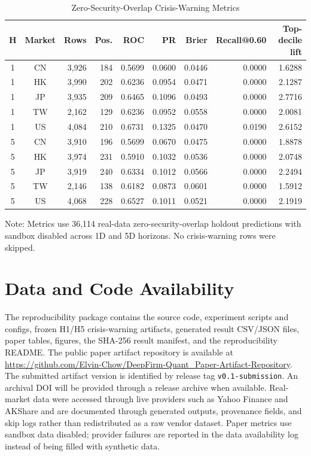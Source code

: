 \documentclass{ieeeaccess}
\newcommand{\tabnote}[1]{\vspace{2pt}\begin{flushleft}\footnotesize Note: #1\end{flushleft}}
\begin{document}
\begin{table}[t]
\caption{Zero-Security-Overlap Crisis-Warning Metrics}
\label{tab:zero-crisis}
\centering
\scriptsize
\begin{tabularx}{\textwidth}{c c r r r r r r r}
\toprule
H & Market & Rows & Pos. & ROC & PR & Brier & Recall@0.60 & Top-decile lift \\
\midrule
1 & CN & 3,926 & 184 & 0.5699 & 0.0600 & 0.0446 & 0.0000 & 1.6288 \\
1 & HK & 3,990 & 202 & 0.6236 & 0.0954 & 0.0471 & 0.0000 & 2.1287 \\
1 & JP & 3,935 & 209 & 0.6465 & 0.1096 & 0.0493 & 0.0000 & 2.7716 \\
1 & TW & 2,162 & 129 & 0.6236 & 0.0952 & 0.0558 & 0.0000 & 2.0081 \\
1 & US & 4,084 & 210 & 0.6731 & 0.1325 & 0.0470 & 0.0190 & 2.6152 \\
5 & CN & 3,910 & 196 & 0.5699 & 0.0670 & 0.0475 & 0.0000 & 1.8878 \\
5 & HK & 3,974 & 231 & 0.5910 & 0.1032 & 0.0536 & 0.0000 & 2.0748 \\
5 & JP & 3,919 & 240 & 0.6334 & 0.1012 & 0.0566 & 0.0000 & 2.2494 \\
5 & TW & 2,146 & 138 & 0.6182 & 0.0873 & 0.0601 & 0.0000 & 1.5912 \\
5 & US & 4,068 & 228 & 0.6527 & 0.1011 & 0.0521 & 0.0000 & 2.1919 \\
\bottomrule
\end{tabularx}
\tabnote{Metrics use 36,114 real-data zero-security-overlap holdout predictions with sandbox disabled across 1D and 5D horizons. No crisis-warning rows were skipped.}
\end{table}

\clearpage

\raggedbottom

\section*{Data and Code Availability}
The reproducibility package contains the source code, experiment scripts and configs, frozen H1/H5 crisis-warning artifacts, generated result CSV/JSON files, paper tables, figures, the SHA-256 result manifest, and the reproducibility README. The public paper artifact repository is available at \url{https://github.com/Elvin-Chow/DeepFirm-Quant_Paper-Artifact-Repository}. The submitted artifact version is identified by release tag \texttt{v0.1-submission}. An archival DOI will be provided through a release archive when available. Real-market data were accessed through live providers such as Yahoo Finance and AKShare and are documented through generated outputs, provenance fields, and skip logs rather than redistributed as a raw vendor dataset. Paper metrics use sandbox data disabled; provider failures are reported in the data availability log instead of being filled with synthetic data.
\end{document}

